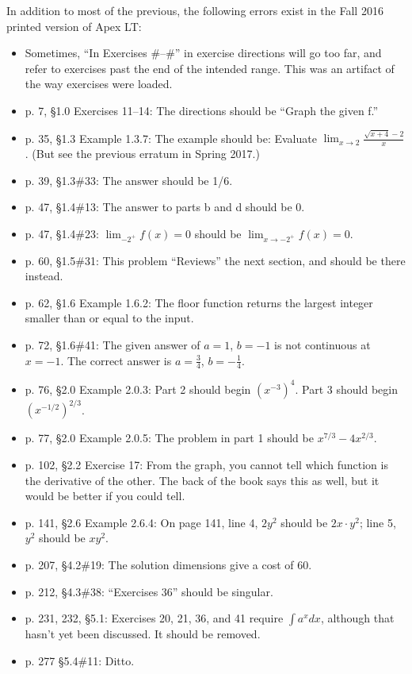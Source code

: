 \documentclass{amsart}
\newcommand{\ds}{\displaystyle}
\begin{document}
In addition to most of the previous, the following errors exist in the Fall 2016 printed version of Apex LT:
\begin{itemize}
\item Sometimes, ``In Exercises \#--\#'' in exercise directions will go too far, and refer to exercises past the end of the intended range. This was an artifact of the way exercises were loaded.
\item p. 7, \S1.0 Exercises 11--14: The directions should be ``Graph the given f.''
\item p. 35, \S1.3 Example 1.3.7: The example should be: Evaluate $\ds\lim_{x\to2}\frac{\sqrt{x+4}-2}x$. (But see the previous erratum in Spring 2017.)
\item p. 39, \S1.3\#33: The answer should be 1/6.
\item p. 47, \S1.4\#13: The answer to parts b and d should be 0.
\item p. 47, \S1.4\#23: $\ds\lim_{-2^+}f(x)=0$ should be $\ds\lim_{x\to-2^+}f(x)=0$.
\item p. 60, \S1.5\#31: This problem ``Reviews'' the next section, and should be there instead.
\item p. 62, \S1.6 Example 1.6.2: The floor function returns the largest integer smaller than or equal to the input.
\item p. 72, \S1.6\#41: The given answer of $a=1$, $b=−1$ is not continuous at $x=−1$. The correct answer is $a=\frac34$, $b=−\frac14$.
\item p. 76, \S2.0 Example 2.0.3: Part 2 should begin $(x^{−3})^4$. Part 3 should begin $(x^{−1/2})^{2/3}$.
\item p. 77, \S2.0 Example 2.0.5: The problem in part 1 should be $x^{7/3}−4x^{2/3}$.
\item p. 102, \S2.2 Exercise 17: From the graph, you cannot tell which function is the derivative of the other. The back of the book says this as well, but it would be better if you could tell.
\item p. 141, \S2.6 Example 2.6.4: On page 141, line 4, $2y^2$ should be $2x\cdot y^2$; line 5, $y^2$ should be $xy^2$.
\item p. 207, \S4.2\#19: The solution dimensions give a cost of 60.
\item p. 212, \S4.3\#38: ``Exercises 36'' should be singular.
\item p. 231, 232, \S5.1: Exercises 20, 21, 36, and 41 require $\int a^x dx$, although that hasn't yet been discussed. It should be removed.
\item p. 277 \S5.4\#11: Ditto.

\end{itemize}
\end{document}
